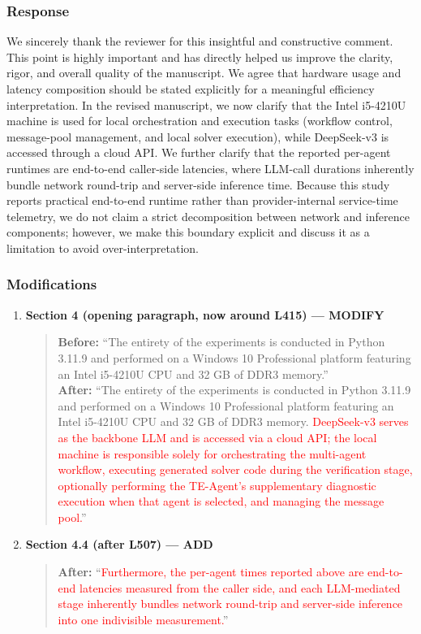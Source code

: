 \documentclass[11pt,a4paper]{article}
\begin{document}
\subsubsection{Response}
We sincerely thank the reviewer for this insightful and constructive comment. This point is highly important and has directly helped
us improve the clarity, rigor, and overall quality of the manuscript. We agree that hardware usage and latency composition should be stated explicitly for a meaningful efficiency interpretation. In the revised manuscript, we now clarify that the Intel i5-4210U machine is used for local orchestration and execution tasks (workflow control, message-pool management, and local solver execution), while DeepSeek-v3 is accessed through a cloud API. We further clarify that the reported per-agent runtimes are end-to-end caller-side latencies, where LLM-call durations inherently bundle network round-trip and server-side inference time. Because this study reports practical end-to-end runtime rather than provider-internal service-time telemetry, we do not claim a strict decomposition between network and inference components; however, we make this boundary explicit and discuss it as a limitation to avoid over-interpretation.

\subsubsection{Modifications}
\begin{enumerate}
\item \textbf{Section 4 (opening paragraph, now around L415) --- MODIFY}
\begin{quote}
\textbf{Before:} ``The entirety of the experiments is conducted in Python 3.11.9 and performed on a Windows 10 Professional platform featuring an Intel i5-4210U CPU and 32 GB of DDR3 memory.''\\[4pt]
\textbf{After:} ``The entirety of the experiments is conducted in Python 3.11.9 and performed on a Windows 10 Professional platform featuring an Intel i5-4210U CPU and 32 GB of DDR3 memory. \textcolor{red}{DeepSeek-v3 serves as the backbone LLM and is accessed via a cloud API; the local machine is responsible solely for orchestrating the multi-agent workflow, executing generated solver code during the verification stage, optionally performing the TE-Agent's supplementary diagnostic execution when that agent is selected, and managing the message pool.}''
\end{quote}

\item \textbf{Section 4.4 (after L507) --- ADD}
\begin{quote}
\textbf{After:} ``\textcolor{red}{Furthermore, the per-agent times reported above are end-to-end latencies measured from the caller side, and each LLM-mediated stage inherently bundles network round-trip and server-side inference into one indivisible measurement.}''
\end{quote}
\end{enumerate}
\end{document}
